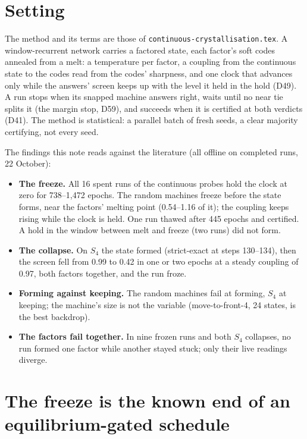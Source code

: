 \documentclass[11pt]{article}
\begin{document}
\section{Setting}

The method and its terms are those of \texttt{continuous-crystallisation.tex}. A window-recurrent
network carries a factored state, each factor's soft codes annealed from a melt: a temperature per
factor, a coupling from the continuous state to the codes read from the codes' sharpness, and one
clock that advances only while the answers' screen keeps up with the level it held in the hold
(D49). A run stops when its snapped machine answers right, waits until no near tie splits it (the
margin stop, D59), and succeeds when it is certified at both verdicts (D41). The method is
statistical: a parallel batch of fresh seeds, a clear majority certifying, not every seed.

The findings this note reads against the literature (all offline on completed runs,
22 October):
\begin{itemize}
\item \textbf{The freeze.} All 16 spent runs of the continuous probes hold the clock at zero for
738--1{,}472 epochs. The random machines freeze before the state forms, near the factors' melting
point (0.54--1.16 of it); the coupling keeps rising while the clock is held. One run thawed after
445 epochs and certified. A hold in the window between melt and freeze (two runs) did not form.
\item \textbf{The collapse.} On $S_4$ the state formed (strict-exact at steps 130--134), then the
screen fell from 0.99 to 0.42 in one or two epochs at a steady coupling of 0.97, both factors
together, and the run froze.
\item \textbf{Forming against keeping.} The random machines fail at forming, $S_4$ at keeping; the
machine's size is not the variable (move-to-front-4, 24 states, is the best backdrop).
\item \textbf{The factors fail together.} In nine frozen runs and both $S_4$ collapses, no run formed
one factor while another stayed stuck; only their live readings diverge.
\end{itemize}

\section{The freeze is the known end of an equilibrium-gated schedule}
\end{document}
